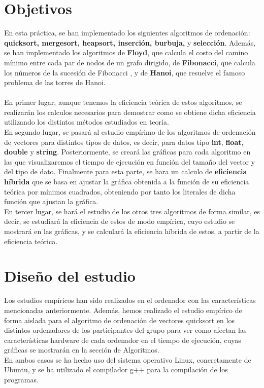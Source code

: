 \documentclass[11pt]{article}
\newcommand{\negrita}[1]{\textbf{#1}}
\begin{document}
\section{Objetivos}
    En esta práctica, se han implementado los siguientes algoritmos de ordenación: \negrita{quicksort, mergesort, heapsort, inserción, burbuja,}
    y \negrita{selección}. Además, se han implementado los algoritmos de \negrita{Floyd}, que calcula el costo del camino mínimo entre cada par de nodos 
    de un grafo dirigido, de \negrita{Fibonacci}, que calcula los números de la sucesión de Fibonacci , y de \negrita{Hanoi}, que resuelve el famoso 
    problema de las torres de Hanoi. \\ \\
    En primer lugar, aunque tenemos la eficiencia teórica de estos algoritmos, se realizarán los calculos necesarios para demostrar
    como se obtiene dicha eficiencia utilizando los distintos métodos estudiados en teoría. \\
    En segundo lugar, se pasará al estudio empírimo de los algoritmos de ordenación de vectores para distintos tipos de datos, es decir, 
    para datos tipo \negrita{int}, \negrita{float}, \negrita{double} y \negrita{string}. Posteriormente, se creará las gráficas para
    cada algoritmo en las que visualizaremos el tiempo de ejecución en función del tamaño del vector y del tipo de dato. Finalmente 
    para esta parte, se hara un calculo de \negrita{eficiencia híbrida} que se basa en ajustar la gráfica obtenida a la función de su eficiencia
    teórica por mínimos cuadrados, obteniendo por tanto los literales de dicha función que ajustan la gráfica.\\
    En tercer lugar, se hará el estudio de los otros tres algoritmos de forma similar, es decir, se estudiará la eficiencia
    de estos de modo empírica, cuyo estudio se mostrará en las gráficas, y se calculará la eficiencia híbrida de estos, a partir
    de la eficiencia teórica.\\ 
\section{Diseño del estudio}
    \newcommand{\mivar}{ordenación de vectores quicksort}
    Los estudios empíricos han sido realizados en el ordenador con las características mencionadas anteriormente.
    Además, hemos realizado el estudio empírico de forma aislada para el algoritmo de ordenación de vectores
    quicksort en los distintos ordenadores de los participantes del grupo para ver como afectan las características
    hardware de cada ordenador en el tiempo de ejecución, cuyas gráficas se mostrarán en la sección de Algoritmos. \\
    En ambos casos se ha hecho uso del sistema operativo Linux, concretamente de Ubuntu, y se ha utilizado el
    compilador g++ para la compilación de los programas.
\end{document}
